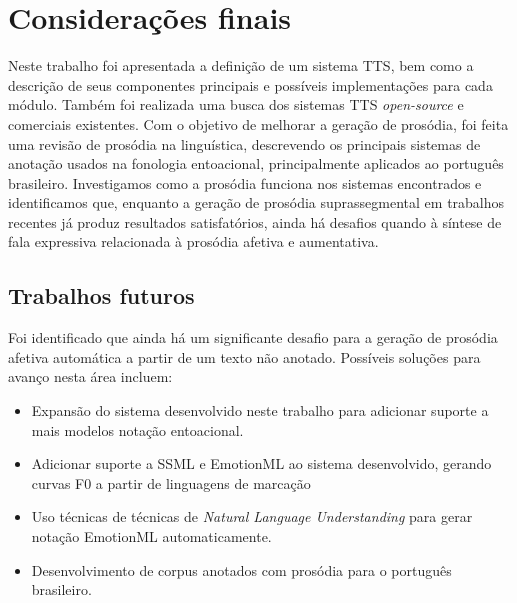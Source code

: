 
\chapter{Considerações finais}
Neste trabalho foi apresentada a definição de um sistema TTS, bem como a descrição
de seus componentes principais e possíveis implementações para cada módulo.
Também foi realizada uma busca dos sistemas TTS \emph{open-source} e comerciais
existentes. Com o objetivo de melhorar a geração de prosódia, foi feita uma
revisão de prosódia na linguística, descrevendo os principais sistemas de
anotação usados na fonologia entoacional, principalmente aplicados ao português
brasileiro. Investigamos como a prosódia funciona nos sistemas encontrados e
identificamos que, enquanto a geração de prosódia suprassegmental em trabalhos
recentes já produz resultados satisfatórios, ainda há desafios quando à síntese
de fala expressiva relacionada à prosódia afetiva e aumentativa.

\section{Trabalhos futuros}
Foi identificado que ainda há um significante desafio para a geração de prosódia
afetiva automática a partir de um texto não anotado. Possíveis soluções para
avanço nesta área incluem:
\begin{itemize}
\item Expansão do sistema desenvolvido neste trabalho para adicionar suporte a
  mais modelos notação entoacional.
\item Adicionar suporte a SSML e EmotionML ao sistema desenvolvido, gerando
  curvas F0 a partir de linguagens de marcação
\item Uso técnicas de técnicas de \emph{Natural Language Understanding} para gerar notação EmotionML automaticamente.
\item Desenvolvimento de corpus anotados com prosódia para o português brasileiro.
\end{itemize}

